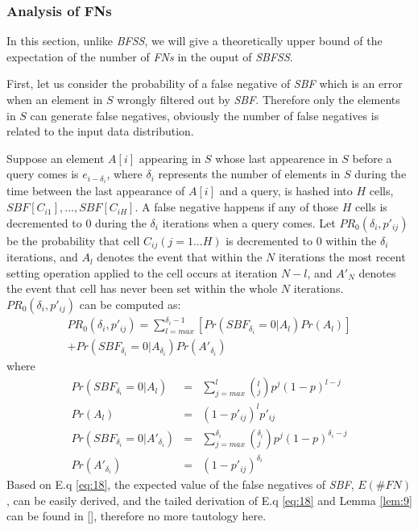 \documentclass[conference]{IEEEtran}
\begin{document}
\subsubsection{\textbf{Analysis of FNs}}
In this section, unlike \emph{BFSS}, we will give a theoretically upper bound of the expectation of the number of \emph{FNs} in the ouput of \emph{SBFSS}. \par
First, let us consider the probability of a false negative of \emph{SBF} which is an error when an element in $S$ wrongly filtered out by \emph{SBF}. Therefore only the elements in $S$ can generate false negatives, obviously the number of false negatives is related to the input data distribution.\par
Suppose an element $A[i]$ appearing in $S$ whose last appearence in $S$ before a query comes is $e_{i-\delta_i}$, where $\delta_i$ represents the number of elements in $S$ during the time between the last appearance of $A[i]$ and a query, is hashed into $H$ cells, $SBF[C_{i1}],...,SBF[C_{iH}]$. A false negative happens if any of those $H$ cells is decremented to 0 during the $\delta_i$ iterations when a query comes. Let $PR_0(\delta_i,p'_{ij})$ be the probability that cell $C_{ij} (j = 1...H)$ is decremented to 0 within the $\delta_i$ iterations, and $A_l$ denotes the event that within the $N$ iterations the most recent setting operation applied to the cell occurs at iteration $N-l$, and $A'_N$ denotes the event that cell has never been set within the whole $N$ iterations. $PR_0(\delta_i,p'_{ij})$ can be computed as:
\begin{equation}\label{eq:18}
\begin{split}
PR_0(\delta_i,p'_{ij})=\sum_{l=max}^{\delta_i-1}[Pr(SBF_{\delta_i}=0|A_l)Pr(A_l)]\\
+Pr(SBF_{\delta_i}=0|A_{\delta_i})Pr(A'_{\delta_i})
\end{split}
\end{equation}
where 
\setlength{\arraycolsep}{0.0em}
\begin{eqnarray}\label{eq:19}
Pr(SBF_{\delta_i}=0|A_l)&=&\sum_{j=max}^{l}\left(^l_j\right)p^j(1-p)^{l-j}\\
Pr(A_l)&=&(1-p'_{ij})^lp'_{ij}\\
Pr(SBF_{\delta_i}=0|A'_{\delta_i})&=&\sum_{j=max}^{\delta_i}\left(^{\delta_i}_j\right)p^j(1-p)^{\delta_i-j}\\
Pr(A'_{\delta_i})&=&(1-p'_{ij})^{\delta_i}
\end{eqnarray}
\setlength{\arraycolsep}{5pt}
Based on E.q \ref{eq:18}, the expected value of the false negatives of \emph{SBF}, $E(\#FN)$, can be easily derived, and the tailed derivation of E.q \ref{eq:18} and Lemma \ref{lem:9} can be found in [], therefore no more tautology here.\par
\end{document}
